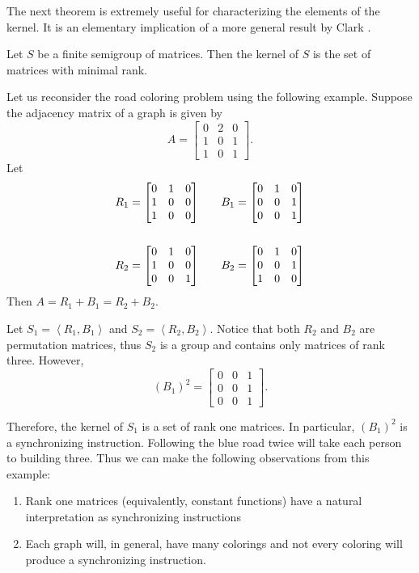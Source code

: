 The next theorem is extremely useful for characterizing the elements of the
kernel. It is an elementary implication of a more 
general result by Clark \cite{Cl}.

\begin{theorem}		\label{thm:4.2}  
Let $S$ be a finite semigroup of matrices. 
Then the kernel of $S$ is the set of matrices with minimal rank.
\end{theorem}

\begin{example}		\label{exm:4.1}
Let us reconsider the road coloring problem using the following example.
Suppose the adjacency matrix of a graph is given by 
\[
  A=\begin{bmatrix}
	0 &2 & 0 \\
	1 & 0 & 1 \\
	1 & 0 & 1
  \end{bmatrix}.
\]
Let
\[
\begin{alignedat}{2}
  R_1 &=\bmatrix 0 & 1 & 0 \\ 1 & 0 & 0 \\ 1 & 0 & 0\endbmatrix & \qquad 
  B_1 &=\bmatrix 0 & 1 & 0 \\ 0 & 0 & 1 \\ 0 & 0 & 1\endbmatrix \\
\\
  R_2 &=\bmatrix 0 & 1 & 0 \\ 1 & 0 & 0 \\ 0 & 0 & 1\endbmatrix & \qquad
  B_2 &=\bmatrix 0 & 1 & 0 \\ 0 & 0 & 1 \\ 1 & 0 & 0\endbmatrix
\end{alignedat}
\]
Then $A=R_1+B_1=R_2+B_2$.

Let $S_1=\left\langle R_1,B_1\right\rangle$ and $S_2=\left\langle
R_2,B_2\right\rangle$. 
Notice that both $R_2$ and $B_2$ are permutation matrices, thus $S_2$ is a group and contains only matrices of rank three. 
However, 
\[
  \left( B_1\right) ^2=\begin{bmatrix}
	0 & 0 & 1 \\
	0 & 0 & 1 \\
	0 & 0 & 1
  \end{bmatrix}.
\]

Therefore, the kernel of $S_1$ is a set of rank one matrices. In particular,
$\left( B_1\right) ^2$ is a synchronizing instruction. 
Following the blue road twice will take each person to building three. Thus
we can make the following observations from 
this example:

\vphantom{...}
%
\begin{enumerate}
\item[(1)] Rank one matrices (equivalently, constant functions) have a
natural interpretation as synchronizing instructions

\item[(2)] Each graph will, in general, have many colorings and not
every coloring will produce a synchronizing instruction.
\end{enumerate}
%
\end{example}

